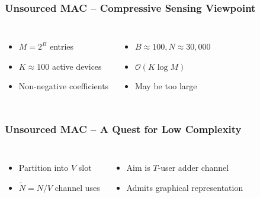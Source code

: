 \documentclass[10pt]{beamer}
\begin{document}
\begin{frame}
\frametitle{Unsourced MAC -- Compressive Sensing Viewpoint}
\begin{center}
\scalebox{0.55}{}
\end{center}
\begin{columns}
\begin{itemize}
\item $M = 2^B$ entries
\item $K \approx 100$ active devices
\item Non-negative coefficients
\end{itemize}
\begin{itemize}
\item $B \approx 100, N \approx 30,000$
\item $\mathcal{O} (K \log M)$
\item May be too large
\end{itemize}
\end{columns}
\end{frame}


\begin{frame}
\frametitle{Unsourced MAC -- A Quest for Low Complexity}
\begin{center}
\scalebox{0.55}{}
\end{center}
\begin{columns}
\begin{itemize}
\item Partition into $V$ slot
\item $\tilde{N} = N/V$ channel uses
\end{itemize}
\begin{itemize}
\item Aim is $T$-user adder channel
\item Admits graphical representation
\end{itemize}
\end{columns}
\end{frame}
\end{document}
